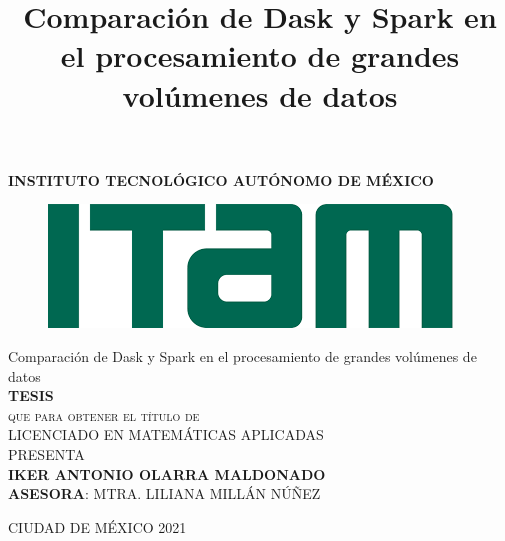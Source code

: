 \documentclass[11pt, oneside]{book}
\begin{document}

\title{Comparación de Dask y Spark en el procesamiento de grandes volúmenes de datos} %

\begin{titlepage}
\begin{center}

\textbf{INSTITUTO TECNOLÓGICO AUTÓNOMO DE MÉXICO}\\[2em]

\begin{figure}[h]
\begin{center}
\includegraphics[scale=0.50]{itam_logo.png}
\end{center}
\end{figure}


{\LARGE Comparación de Dask y Spark en el procesamiento de grandes volúmenes de datos}\\[2em]

\textbf{\large TESIS}\\[2em]

\textsc{\large que para obtener el título de}\\[1em]

\textsc{\large LICENCIADO EN MATEMÁTICAS APLICADAS}\\[1em]

\textsc{\small PRESENTA}\\[2em]

\textbf{\large IKER ANTONIO OLARRA MALDONADO}\\[2em]


\textsc{\textbf{ASESORA}: MTRA. LILIANA MILLÁN NÚÑEZ}\\[2em]


\end{center}

\vspace*{\fill}
\textsc{CIUDAD DE MÉXICO \hspace*{\fill} 2021}

\end{titlepage}
\end{document}
